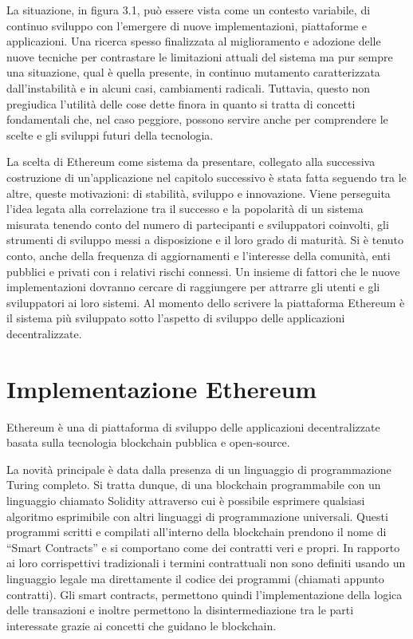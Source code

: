 La situazione, in figura 3.1, può essere vista come un contesto variabile, di continuo sviluppo con l’emergere di nuove implementazioni, piattaforme e applicazioni. Una ricerca spesso finalizzata al miglioramento e adozione delle nuove tecniche per contrastare le limitazioni attuali del sistema ma pur sempre una situazione, qual è quella presente, in continuo mutamento caratterizzata dall'instabilità e in alcuni casi, cambiamenti radicali. Tuttavia, questo non pregiudica l’utilità delle cose dette finora in quanto si tratta di concetti fondamentali che, nel caso peggiore, possono servire anche per comprendere le scelte e gli sviluppi futuri della tecnologia.

La scelta di Ethereum come sistema da presentare, collegato alla successiva costruzione di un’applicazione nel capitolo successivo è stata fatta seguendo tra le altre, queste motivazioni: di stabilità, sviluppo e innovazione. Viene perseguita l'idea legata alla correlazione tra il successo e la popolarità di un sistema misurata tenendo conto del numero di partecipanti e sviluppatori coinvolti, gli strumenti di sviluppo messi a disposizione e il loro grado di maturità. Si è tenuto conto, anche della frequenza di aggiornamenti e l’interesse della comunità, enti pubblici e privati con i relativi rischi connessi. Un insieme di fattori che le nuove implementazioni dovranno cercare di raggiungere per attrarre gli utenti e gli sviluppatori ai loro sistemi. Al momento dello scrivere la piattaforma Ethereum è il sistema più sviluppato sotto l’aspetto di sviluppo delle applicazioni decentralizzate.

\section{Implementazione Ethereum}

Ethereum è una di piattaforma di sviluppo delle applicazioni decentralizzate basata sulla tecnologia blockchain pubblica e open-source.

La novità principale è data dalla presenza di un linguaggio di programmazione Turing completo. Si tratta dunque, di una blockchain programmabile con un linguaggio chiamato Solidity attraverso cui è possibile esprimere qualsiasi algoritmo esprimibile con altri linguaggi di programmazione universali. Questi programmi scritti e compilati all’interno della blockchain prendono il nome di “Smart Contracts” e si comportano come dei contratti veri e propri. In rapporto ai loro corrispettivi tradizionali i termini contrattuali non sono definiti usando un linguaggio legale ma direttamente il codice dei programmi (chiamati appunto contratti). Gli smart contracts, permettono quindi l’implementazione della logica delle transazioni e inoltre permettono la disintermediazione tra le parti interessate grazie ai concetti che guidano le blockchain. 

